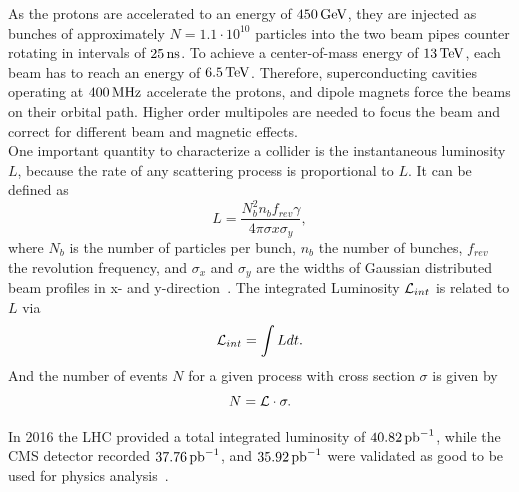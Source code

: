 As the protons are accelerated to an energy of $450\,\text{Ge\hspace{-.08em}V}$, they are injected as bunches of approximately $N=1.1\cdot10^{10}$ particles into the two beam pipes counter rotating in intervals of $25\,\text{ns}$. To achieve a center-of-mass energy of $13\,\text{Te\hspace{-.08em}V}$, each beam has to reach an energy of $6.5\,\text{Te\hspace{-.08em}V}$. Therefore, superconducting cavities operating at $400\,\text{MHz}$ accelerate the protons, and dipole magnets force the beams on their orbital path. Higher order multipoles are needed to focus the beam and correct for different beam and magnetic effects.\\
One important quantity to characterize a collider is the instantaneous luminosity $L$, because the rate of any scattering process is proportional to $L$. It can be defined as
\begin{equation}
 L = \frac{N_{b}^2 n_{b} f_{rev} \gamma} {4\pi \sigma{x} \sigma_{y}},
\end{equation}
where $N_b$ is the number of particles per bunch, $n_b$ the number of bunches, $f_{rev}$ the revolution frequency,  and $\sigma_{x}$ and $\sigma_{y}$ are the widths of Gaussian distributed beam profiles in x- and y-direction~\cite{LuminosityConcept}. The integrated Luminosity $\mathcal{L}_{int}$ is related to $L$ via
\begin{equation}
 \mathcal{L}_{int}= \int L dt.
\end{equation}
And the number of events $N$ for a given process with cross section $\sigma$ is given by
\begin{equation}
 N= \mathcal{L} \cdot \sigma.
\end{equation}

In 2016 the LHC provided a total integrated luminosity of $40.82\mbox{\ensuremath{\,\text{pb}^\text{$-$1}}}$, while the CMS detector recorded $37.76\mbox{\ensuremath{\,\text{pb}^\text{$-$1}}}$, and $35.92\mbox{\ensuremath{\,\text{pb}^\text{$-$1}}}$ were validated as good to be used for physics analysis~\cite{DataQuality}.





